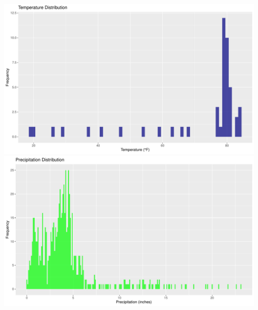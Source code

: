 \documentclass[
]{article}
\begin{document}
\includegraphics{climate_files/figure-latex/trend_visualization-1.pdf}
\includegraphics{climate_files/figure-latex/trend_visualization-2.pdf}
\end{document}
